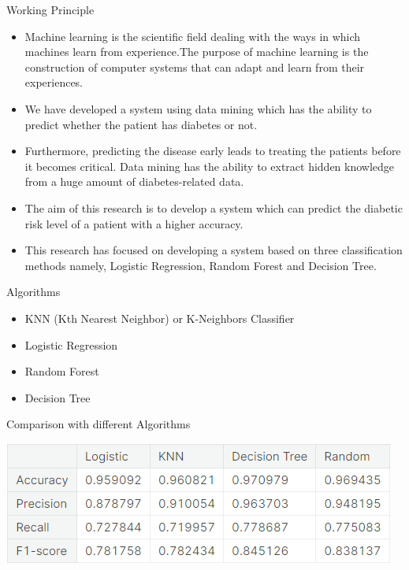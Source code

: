 \documentclass{SKP-beamer}
\begin{document}
\begin{frame}{Working Principle}
	\begin{itemize}
		\item Machine learning is the scientific field
		dealing with the ways in which machines learn from
		experience.The purpose of
		machine learning is the construction of computer
		systems that can adapt and learn from their experiences.
		\item We have developed a system using data
		mining which has the ability to predict whether the
		patient has diabetes or not.
		\item Furthermore, predicting
		the disease early leads to treating the patients before
		it becomes critical. Data mining has the ability to
		extract hidden knowledge from a huge amount of
		diabetes-related data.
		\item The aim of this research is to develop a system
		which can predict the diabetic risk level of a patient
		with a higher accuracy. 
		\item This research has focused on
		developing a system based on three classification
		methods namely, Logistic Regression, Random Forest and Decision Tree.
	\end{itemize}
\end{frame}

\begin{frame}{Algorithms}
	\begin{itemize}
		\item KNN (Kth Nearest Neighbor) or K-Neighbors Classifier
		\item Logistic Regression
		\item Random Forest
		\item Decision Tree
		
	\end{itemize}
\end{frame}


\begin{frame}{Comparison with different Algorithms}
	\begin{center}
		\includegraphics[scale=0.48]{com.png}
	\end{center}
\end{frame}
\end{document}
